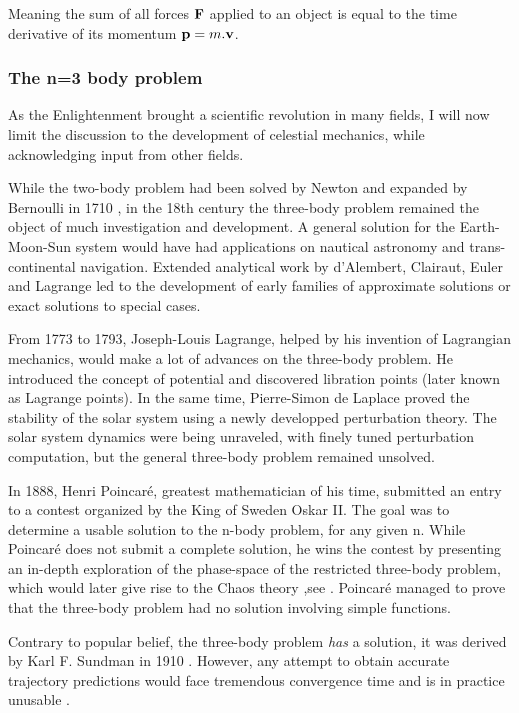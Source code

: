 Meaning the sum of all forces $\bold{F}$ applied to an object is equal to the time derivative of its momentum $\bold{p} = m.\bold{v}$.



\subsubsection*{The n=3 body problem}

As the Enlightenment brought a scientific revolution in many fields, I will now limit the discussion to the development of celestial mechanics, while acknowledging input from other fields.

While the two-body problem had been solved by Newton and expanded by Bernoulli in 1710 \citep{Barrow1997}, in the 18th century the three-body problem remained the object of much investigation and development. A general solution for the Earth-Moon-Sun system would have had applications on nautical astronomy and trans-continental navigation. Extended analytical work by d'Alembert, Clairaut, Euler and Lagrange led to the development of early families of approximate solutions or exact solutions to special cases.

From 1773 to 1793, Joseph-Louis Lagrange, helped by his invention of Lagrangian mechanics, would make a lot of advances on the three-body problem. He introduced the concept of potential and discovered libration points (later known as Lagrange points). In the same time, Pierre-Simon de Laplace proved the stability of the solar system using a newly developped perturbation theory. The solar system dynamics were being unraveled, with finely tuned perturbation computation, but the general three-body problem remained unsolved.

In 1888, Henri Poincaré, greatest mathematician of his time, submitted an entry to a contest organized by the King of Sweden Oskar II. The goal was to determine a usable solution to the n-body problem, for any given n. While Poincaré does not submit a complete solution, he wins the contest by presenting an in-depth exploration of the phase-space of the restricted three-body problem, which would later give rise to the Chaos theory ,see \cite{Yoccoz2010}. Poincaré managed to prove that the three-body problem had no  solution involving simple functions.

Contrary to popular belief, the three-body problem \textit{has} a solution, it was derived by Karl F. Sundman in 1910 \citep{Sundman1910}. However, any attempt to obtain accurate trajectory predictions would face tremendous convergence time and is in practice unusable \citep{Beloriszky1930}.

